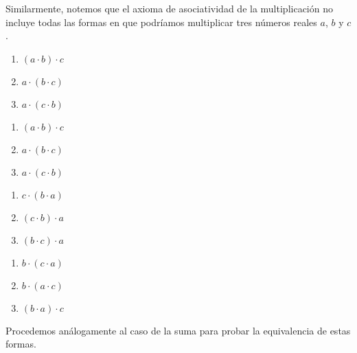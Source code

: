 \documentclass[11pt]{article}
\begin{document}
Similarmente, notemos que el axioma de asociatividad de la multiplicación no incluye todas las formas en que podríamos multiplicar tres números reales $a$, $b$ y $c$.

\begin{center}
    \begin{minipage}[c]{.2\linewidth}
        \begin{enumerate}[label=\roman*.]
            \item $(a\cdot b)\cdot c$
            \item $a\cdot (b\cdot c)$
            \item $a\cdot (c\cdot b)$
        \end{enumerate}
        \end{minipage}%
        \begin{minipage}[c]{.2\linewidth}
            \begin{enumerate}[start=4,label=\roman*.]
                \item $(a\cdot b)\cdot c$
                \item $a\cdot (b\cdot c)$
                \item $a\cdot (c\cdot b)$
            \end{enumerate}
            \end{minipage}%
        \begin{minipage}[c]{.2\linewidth}
            \begin{enumerate}[start=7,label=\roman*.]
            \item $c\cdot (b\cdot a)$
            \item $(c\cdot b)\cdot a$
            \item $(b\cdot c)\cdot a$
        \end{enumerate}
        \end{minipage}
        \begin{minipage}[c]{.2\linewidth}
            \begin{enumerate}[start=10,label=\roman*.]
            \item $b\cdot (c\cdot a)$
            \item $b\cdot (a\cdot c)$
            \item $(b\cdot a)\cdot c$
        \end{enumerate}
        \end{minipage}
\end{center}

Procedemos análogamente al caso de la suma para probar la equivalencia de estas formas.
\end{document}
